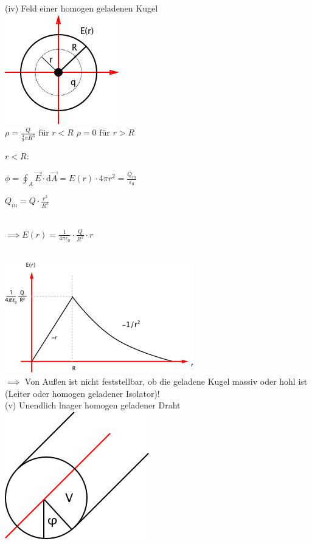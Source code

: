 \documentclass[11pt]{article}
\begin{document}
(iv) Feld einer homogen geladenen Kugel\\

\includegraphics{skizzen/14/14_6B6}\\

$ \rho =\frac{Q}{\frac{4}{3}\pi R^3} \text{ für }r<R $
$ \rho=0 \text{ für }r>R$

\underline{$r<R$}:

$ \phi=\oint_{A}\vec{E}\cdot\mathrm{d}\vec{A} = E(r)\cdot4\pi r^2=\frac{Q_{in}}{\epsilon_0}$

$ Q_{in} = Q\cdot\frac{r^3}{R^3} $

\hfill\\

$\boxed{ \implies E(r)=\frac{1}{4\pi\epsilon_0}\cdot\frac{Q}{R^3}\cdot r }$

\hfill\\

\includegraphics{skizzen/14/14_6B7}\\

$\implies$ Von Außen ist nicht feststellbar, ob die geladene Kugel massiv oder hohl ist (Leiter oder homogen geladener Isolator)!\\

(v) Unendlich lnager homogen geladener Draht\\

\includegraphics{skizzen/14/14_6B8}\\
\end{document}
